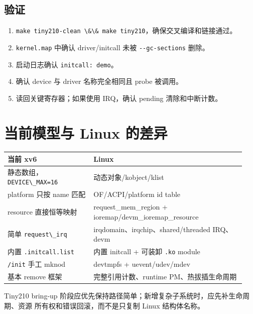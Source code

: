 \subsection{验证}\label{ux9a8cux8bc1}

\begin{enumerate}
\def\labelenumi{\arabic{enumi}.}
\tightlist
\item
  \passthrough{\lstinline!make tiny210-clean \&\& make tiny210!}，确保交叉编译和链接通过。
\item
  \passthrough{\lstinline!kernel.map!} 中确认 driver/initcall 未被
  \passthrough{\lstinline!--gc-sections!} 删除。
\item
  启动日志确认 \passthrough{\lstinline!initcall: demo!}。
\item
  确认 device 与 driver 名称完全相同且 probe 被调用。
\item
  读回关键寄存器；如果使用 IRQ，确认 pending 清除和中断计数。
\end{enumerate}

\section{当前模型与 Linux
的差异}\label{ux5f53ux524dux6a21ux578bux4e0e-linux-ux7684ux5deeux5f02}

{\def\LTcaptype{none} %
\begin{longtable}[]{@{}p{0.34\linewidth}p{0.60\linewidth}@{}}
\toprule\noalign{}
当前 xv6 & Linux \\
\midrule\noalign{}
\endhead
\bottomrule\noalign{}
\endlastfoot
静态数组，\passthrough{\lstinline!DEVICE\_MAX=16!} &
动态对象/kobject/klist \\
platform 只按 name 匹配 & OF/ACPI/platform id table \\
resource 直接恒等映射 & request\_mem\_region +
ioremap/devm\_ioremap\_resource \\
简单 \passthrough{\lstinline!request\_irq!} &
irqdomain、irqchip、shared/threaded IRQ、devm \\
内置 \passthrough{\lstinline!.initcall.list!} & 内置 initcall + 可装卸
\passthrough{\lstinline!.ko!} module \\
\passthrough{\lstinline!/init!} 手工 mknod & devtmpfs +
uevent/udev/mdev \\
基本 remove 框架 & 完整引用计数、runtime PM、热拔插生命周期 \\
\end{longtable}
}

Tiny210 bring-up
阶段应优先保持路径简单；新增复杂子系统时，应先补生命周期、资源
所有权和错误回滚，而不是只复制 Linux 结构体名称。
